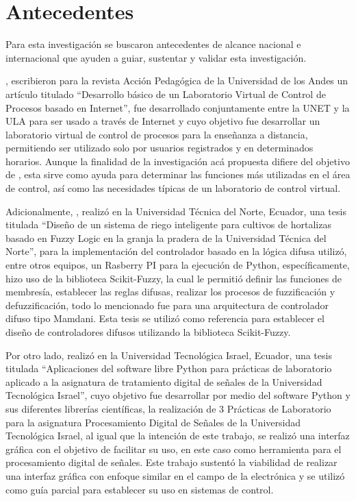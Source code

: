 \section{Antecedentes}
	
    Para esta investigación se buscaron antecedentes de alcance nacional e internacional que ayuden a guiar, sustentar y validar esta investigación.
        
    \textcite{casallas2005desarrollo}, escribieron para la revista Acción Pedagógica de la Universidad de los Andes un artículo titulado \enquote{Desarrollo básico de un Laboratorio Virtual de Control de Procesos basado en Internet}, fue desarrollado conjuntamente entre la UNET y la ULA para ser usado a través de Internet y cuyo objetivo fue desarrollar un laboratorio virtual de control de procesos para la enseñanza a distancia, permitiendo ser utilizado solo por usuarios registrados y en determinados horarios. Aunque la finalidad de la investigación acá propuesta difiere del objetivo de \citeauthor{casallas2005desarrollo}, esta sirve como ayuda para determinar las funciones más utilizadas en el área de control, así como las necesidades típicas de un laboratorio de control virtual.

    Adicionalmente, \textcite{salazar2019diseno}, realizó en la Universidad Técnica del Norte, Ecuador, una tesis titulada \enquote{Diseño de un sistema de riego inteligente para cultivos de hortalizas basado en Fuzzy Logic en la granja la pradera de la Universidad Técnica del Norte}, para la implementación del controlador basado en la lógica difusa utilizó, entre otros equipos, un Rasberry PI para la ejecución de Python, específicamente, hizo uso de la biblioteca Scikit-Fuzzy, la cual le permitió definir las funciones de membresía, establecer las reglas difusas, realizar los procesos de fuzzificación y defuzzificación, todo lo mencionado fue para una arquitectura de controlador difuso tipo Mamdani. Esta tesis se utilizó como referencia para establecer el diseño de controladores difusos utilizando la biblioteca Scikit-Fuzzy.

    Por otro lado, \textcite{congo2018aplicaciones} realizó en la Universidad Tecnológica Israel, Ecuador, una tesis titulada \enquote{Aplicaciones del software libre Python para prácticas de laboratorio aplicado a la asignatura de tratamiento digital de señales de la Universidad Tecnológica Israel}, cuyo objetivo fue desarrollar por medio del software Python y sus diferentes librerías científicas, la realización de 3 Prácticas de Laboratorio para la asignatura Procesamiento Digital de Señales de la Universidad Tecnológica Israel, al igual que la intención de este trabajo, se realizó una interfaz gráfica con el objetivo de facilitar su uso, en este caso como herramienta para el procesamiento digital de señales. Este trabajo sustentó la viabilidad de realizar una interfaz gráfica con enfoque similar en el campo de la electrónica y se utilizó como guía parcial para establecer su uso en sistemas de control.

